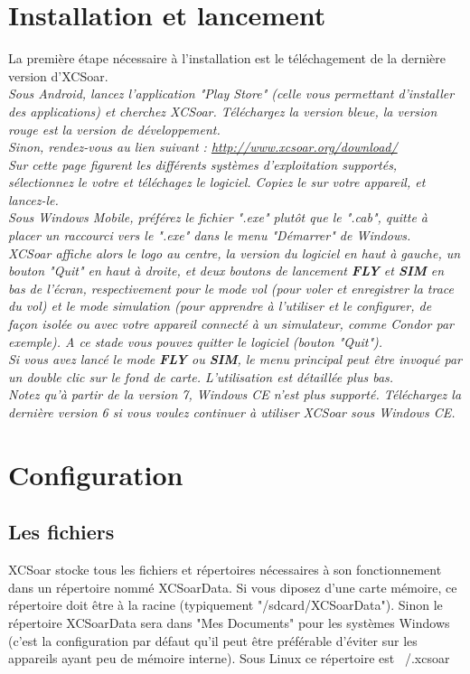 \documentclass{article}
\begin{document}
\section{Installation et lancement}
\noindent
La première étape nécessaire à l'installation est le téléchagement de la dernière version d'XCSoar.\\
%
\newline
%
\itshape Sous Android, lancez l'application "Play Store" (celle vous permettant d'installer des applications) et cherchez XCSoar. Téléchargez la version bleue, la version rouge est la version de développement.\upshape\\
\newline
Sinon, rendez-vous au lien suivant : \url{http://www.xcsoar.org/download/}\\
Sur cette page figurent les différents systèmes d'exploitation supportés, sélectionnez le votre et téléchagez le logiciel. Copiez le sur votre appareil, et lancez-le.\\
%
\newline
%
\itshape Sous Windows Mobile, préférez le fichier ".exe" plutôt que le ".cab", quitte à placer un raccourci vers le ".exe" dans le menu "Démarrer" de Windows.\upshape\\
\newline
XCSoar affiche alors le logo au centre, la version du logiciel en haut à gauche, un bouton "Quit" en haut à droite, et deux boutons de lancement \textbf{FLY} et \textbf{SIM} en bas de l'écran, respectivement pour le mode vol (pour voler et enregistrer la trace du vol) et le mode simulation (pour apprendre à l'utiliser et le configurer, de façon isolée ou avec votre appareil connecté à un simulateur, comme Condor par exemple). A ce stade vous pouvez quitter le logiciel (bouton "Quit").\\
%
Si vous avez lancé le mode \textbf{FLY} ou \textbf{SIM}, le menu principal peut être invoqué par un double clic sur le fond de carte.
L'utilisation est détaillée plus bas.\\
%
\newline
%
Notez qu'à partir de la version 7, Windows CE n'est plus supporté. Téléchargez la dernière version 6 si vous voulez continuer à utiliser XCSoar sous Windows CE.\\
%
\section{Configuration}
%
\subsection{Les fichiers}
\noindent
XCSoar stocke tous les fichiers et répertoires nécessaires à son fonctionnement dans un répertoire nommé XCSoarData. Si vous diposez d'une carte mémoire, ce répertoire doit être à la racine (typiquement "/sdcard/XCSoarData"). Sinon le répertoire XCSoarData sera dans "Mes Documents" pour les systèmes Windows (c'est la configuration par défaut qu'il peut être préférable d'éviter sur les appareils ayant peu de mémoire interne).
%
Sous Linux ce répertoire est ~/.xcsoar\\
\end{document}
